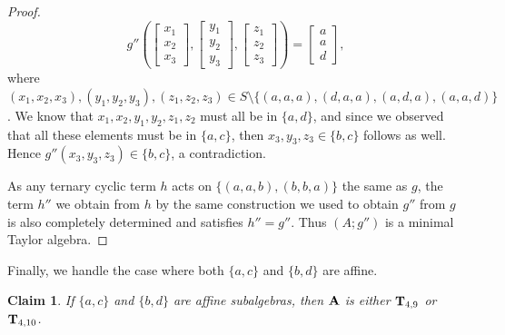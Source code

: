 \documentclass[11pt]{amsart}
\newcommand{\m}[1]{\mathbf{\uppercase{#1}}}
\theoremstyle{definition}
\theoremstyle{remark}
\theoremstyle{plain}
\newtheorem{claim}[thm]{Claim}
\begin{document}
\begin{proof}
\[
g''\left(
\begin{bmatrix}
x_1 \\
x_2 \\
x_3
\end{bmatrix}\!,\!
\begin{bmatrix}
y_1 \\
y_2 \\
y_3
\end{bmatrix}\!,\!
\begin{bmatrix}
z_1 \\
z_2 \\
z_3
\end{bmatrix}
\right)=
\begin{bmatrix}
a \\
a \\
d
\end{bmatrix},
\]
where $(x_1,x_2,x_3),(y_1,y_2,y_3),(z_1,z_2,z_3)\in S\setminus\{(a,a,a), (d,a,a),(a,d,a),(a,a,d)\}$. We know that $x_1,x_2,y_1,y_2,z_1,z_2$ must all be in $\{a,d\}$, and since we observed that all these elements must be in $\{a,c\}$, then $x_3,y_3,z_3\in\{b,c\}$ follows as well. Hence $g''(x_3,y_3,z_3)\in\{b,c\}$, a contradiction.

As any ternary cyclic term $h$ acts on $\{(a,a,b),(b,b,a)\}$ the same as $g$, the term $h''$ we obtain from $h$ by the same construction we used to obtain $g''$ from $g$ is also completely determined and satisfies $h''=g''$. Thus $(A;g'')$ is a minimal Taylor algebra.
\end{proof}
 
 



Finally, we handle the case where both $\{a,c\}$ and $\{b,d\}$ are affine.
 \begin{claim}
  If  $\{a,c\}$ and $\{b,d\}$ are affine subalgebras, then ${\m A}$ is either $\m t_{4,9}$ or $\m t_{4,10}$.
 \end{claim}
\end{document}
